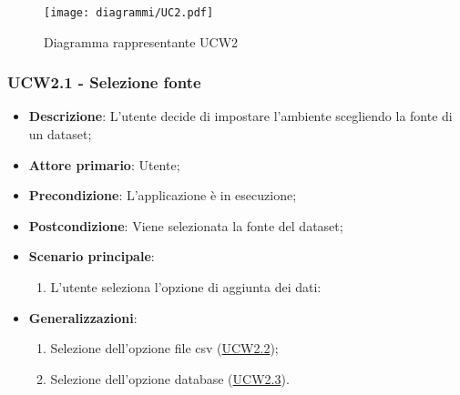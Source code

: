 \begin{figure}[h]
    \centering
    \texttt{[image: diagrammi/UC2.pdf]}
    \caption{Diagramma rappresentante UCW2}
    \label{fig:UCW2}
\end{figure}

\subsubsection{UCW2.1 - Selezione fonte}
\label{ssub:ucw2.1}
\begin{itemize}
    \item \textbf{Descrizione}: L'utente decide di impostare l'ambiente scegliendo la fonte di un dataset;

    \item \textbf{Attore primario}: Utente;
        
    \item \textbf{Precondizione}:   L'applicazione è in esecuzione;

    \item \textbf{Postcondizione}:  Viene selezionata la fonte del dataset;

	\item \textbf{Scenario principale}:
		\begin{enumerate}
			\item L'utente seleziona l'opzione di aggiunta dei dati:
        \end{enumerate}

        \item \textbf{Generalizzazioni}:
        \begin{enumerate}
            \item Selezione dell'opzione file csv (\hyperref[ssub:ucw2.2]{UCW2.2});
            \item Selezione dell'opzione database (\hyperref[ssub:ucw2.3]{UCW2.3}).
        \end{enumerate}
\end{itemize}


